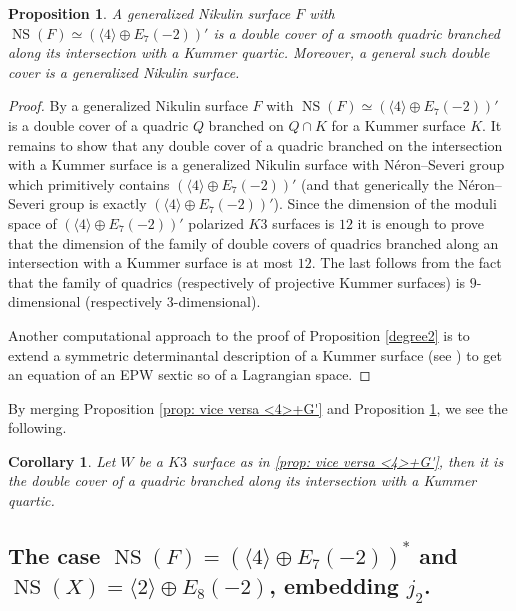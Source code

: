 \documentclass{amsart}
\newtheorem{corollary}[thm]{Corollary}
\newtheorem{prop}[thm]{Proposition}
\theoremstyle{definition}
\numberwithin{equation}{section}
\numberwithin{equation}{section} \theoremstyle{definition}
\DeclareMathOperator{\NS}{NS}
\begin{document}
\begin{prop}\label{prop 10.10}
    A generalized Nikulin surface $F$ with $\NS(F)\simeq (\langle 4\rangle\oplus E_7(-2))'$ is a double cover of a smooth quadric branched along its intersection with a Kummer quartic.
    Moreover, a general such double cover is a generalized Nikulin surface.
\end{prop}
\begin{proof} By \cite[Section 4]{CGKK} a generalized Nikulin surface $F$ with $\NS(F)\simeq (\langle 4\rangle\oplus E_7(-2))'$ is a double cover of a quadric $Q$ branched on $Q\cap K$ for a Kummer surface $K$. It remains to show that any double cover of a quadric branched on the intersection with a Kummer surface is a generalized Nikulin surface with N\'eron--Severi group which primitively contains $(\langle4\rangle\oplus E_7(-2))'$ (and that generically the N\'eron--Severi group is exactly $(\langle4\rangle\oplus E_7(-2))'$). 
 Since the dimension of the moduli space of $( \langle4\rangle\oplus E_7(-2))'$ polarized $K3$ surfaces is 
 $12$ it is enough to prove that the dimension of the family of double covers of quadrics branched along an intersection with a Kummer surface is at most $12$.
 The last follows from the fact that the family of quadrics (respectively of projective Kummer surfaces) is $9$-dimensional  (respectively $3$-dimensional).%
 
   
   Another computational approach to the proof of Proposition \ref{degree2} is to extend a symmetric determinantal
   description of a Kummer surface (see \cite[Section 2]{IKKR}) to get an equation of an EPW sextic so of a Lagrangian space.
\end{proof}

By merging Proposition \ref{prop: vice versa <4>+G'} and Proposition \ref{prop 10.10}, we see the following.
\begin{corollary}
Let $W$ be a $K3$ surface as in \ref{prop: vice versa <4>+G'}, then it is the double cover of a quadric branched along its intersection with a Kummer quartic.\end{corollary}

\subsection{The case $\NS(F)=(\langle 4\rangle\oplus E_7(-2))^*$ and $\NS(X)=\langle 2\rangle\oplus E_8(-2)$, embedding $j_2$.}\label{13.3}\label{subsec: F degree 4 star}
\end{document}

